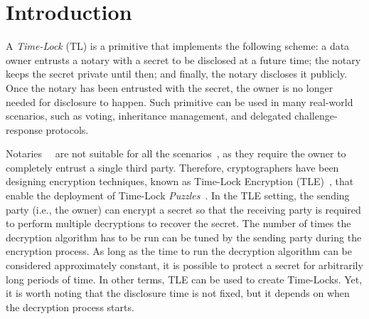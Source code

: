 \section{Introduction}\label{sect:introduction}




A \textit{Time-Lock} (TL) is a primitive that implements the following scheme:
a data owner entrusts a notary with a secret to be disclosed at a
future time; the notary keeps the secret private until then; and finally, the notary discloses it publicly. Once the notary has been entrusted with the secret, the owner is no longer needed for disclosure to happen.
Such primitive can be used in many real-world scenarios, such as voting, inheritance management, and delegated challenge-response protocols.

Notaries~\cite{10.1007/BFb0032349}~\cite{rabin2006time} are not
suitable for all the scenarios~\cite{Abelson:1997:RKR:275079.275104},
as they require the owner to completely entrust a single third party.
Therefore, cryptographers have been designing encryption techniques, known as Time-Lock Encryption (TLE)~\cite{may1993timed}, that enable the deployment of Time-Lock {\em Puzzles}~\cite{mahmoody-tl,Bitansky:2016:TPR:2840728.2840745}.
In the TLE setting, the sending party (i.e., the owner) can encrypt a secret so that the receiving party is required to perform multiple decryptions to recover the secret.
The number of times the decryption algorithm has to be run can be tuned by the sending party during the encryption process.
As long as the time to run the decryption algorithm can be considered approximately constant, it is possible to protect a secret for arbitrarily long periods of time.
In other terms, TLE can be used to create Time-Locks.
Yet, it is worth noting that the disclosure time is not fixed, but it depends on when the decryption process starts.

